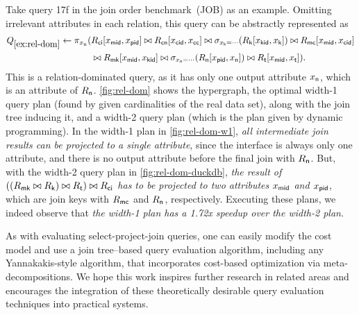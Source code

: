 \begin{example} \label{ex:rel-dom}

    Take query 17f in the join order benchmark~(JOB) as an example. Omitting irrelevant attributes in each relation, this query can be abstractly represented as
    \begin{align*}
        Q_{\ref{ex:rel-dom}} \gets \pi_{x_{\rm n}} ( 
            & R_{\sf ci}[x_{\sf mid}, x_{\sf pid}] \bowtie R_{\sf cn}[x_{\sf cid}, x_{\sf cc}] \bowtie \sigma_{x_{\sf k} = \cdots}(R_{\sf k}[x_{\sf kid}, x_{\sf k}])
            \bowtie R_{\sf mc}[x_{\sf mid}, x_{\sf cid}] \\
            & \bowtie R_{\sf mk}[x_{\sf mid}, x_{\sf kid}] \bowtie \sigma_{x_{\sf n} = \cdots}(R_{\sf n}[x_{\sf pid}, x_{\sf n}]) \bowtie R_{\sf t}[x_{\sf mid}, x_{\sf t}] 
        ).
    \end{align*}
    This is a relation-dominated query, as it has only one output attribute $x_{\sf n}$, which is an attribute of $R_{\sf n}$.
    \cref{fig:rel-dom} shows the hypergraph, the optimal width-1 query plan (found by \sys{} given cardinalities of the real data set), along with the join tree inducing it, and a width-2 query plan (which is the plan given by dynamic programming).
    In the width-1 plan in \cref{fig:rel-dom-w1}, \emph{all intermediate join results can be projected to a single attribute}, since the interface is always only one attribute, and there is no output attribute before the final join with $R_{\sf n}$.
    But, with the width-2 query plan in \cref{fig:rel-dom-duckdb}, \emph{the result of $((R_{\sf mk} \bowtie R_{\sf k}) \bowtie R_{\sf t}) \bowtie R_{\sf ci}$ has to be projected to two attributes $x_{\sf mid}$ and $x_{\sf pid}$}, which are join keys with $R_{\sf mc}$ and $R_{\sf n}$, respectively.
    Executing these plans, we indeed observe that \emph{the width-1 plan has a {\rm 1.72x} speedup over the width-2 plan}.
\end{example}

As with evaluating select-project-join queries, one can easily modify the cost model and use a join tree–based query evaluation algorithm, including any Yannakakis-style algorithm, that incorporates cost-based optimization via meta-decompositions. We hope this work inspires further research in related areas and encourages the integration of these theoretically desirable query evaluation techniques into practical systems.

